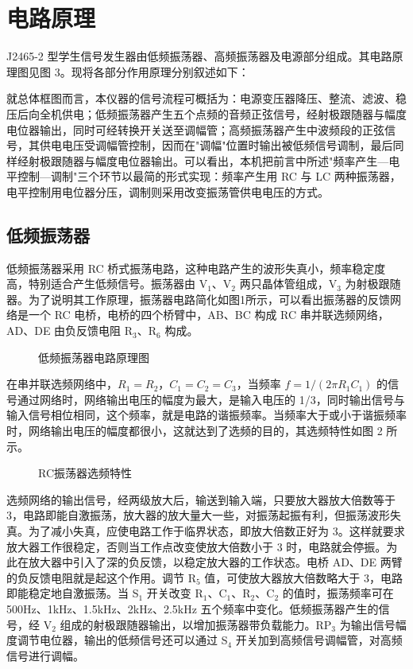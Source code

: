 \documentclass[12pt,UTF8]{ctexbook}
\begin{document}
\section{电路原理}

J2465-2 型学生信号发生器由低频振荡器、高频振荡器及电源部分组成。其电路原理图见图 3。现将各部分作用原理分别叙述如下：

就总体框图而言，本仪器的信号流程可概括为：电源变压器降压、整流、滤波、稳压后向全机供电；低频振荡器产生五个点频的音频正弦信号，经射极跟随器与幅度电位器输出，同时可经转换开关送至调幅管；高频振荡器产生中波频段的正弦信号，其供电电压受调幅管控制，因而在"调幅"位置时输出被低频信号调制，最后同样经射极跟随器与幅度电位器输出。可以看出，本机把前言中所述"频率产生—电平控制—调制"三个环节以最简的形式实现：频率产生用 RC 与 LC 两种振荡器，电平控制用电位器分压，调制则采用改变振荡管供电电压的方式。
	
\subsection{低频振荡器}

低频振荡器采用 RC 桥式振荡电路，这种电路产生的波形失真小，频率稳定度高，特别适合产生低频信号。振荡器由 V\(_1\)、V\(_2\) 两只晶体管组成，V\(_3\) 为射极跟随器。为了说明其工作原理，振荡器电路简化如图1所示，可以看出振荡器的反馈网络是一个 RC 电桥，电桥的四个桥臂中，AB、BC 构成 RC 串并联选频网络，AD、DE 由负反馈电阻 R\(_3\)、R\(_6\) 构成。
	
	\begin{figure}[H]
		\centering
		\caption{低频振荡器电路原理图}
		\label{fig:low_freq_osc}
	\end{figure}
	
	在串并联选频网络中，\(R_1=R_2\)，\(C_1=C_2=C_3\)，当频率 \(f=1/(2\pi R_1C_1)\) 的信号通过网络时，网络输出电压的幅度为最大，是输入电压的 1/3，同时输出信号与输入信号相位相同，这个频率，就是电路的谐振频率。当频率大于或小于谐振频率时，网络输出电压的幅度都很小，这就达到了选频的目的，其选频特性如图 2 所示。
	
	\begin{figure}[H]
		\centering
		\caption{RC振荡器选频特性}
		\label{fig:rc_response}
	\end{figure}
	
	选频网络的输出信号，经两级放大后，输送到输入端，只要放大器放大倍数等于 3，电路即能自激振荡，放大器的放大量大一些，对振荡起振有利，但振荡波形失真。为了减小失真，应使电路工作于临界状态，即放大倍数正好为 3。这样就要求放大器工作很稳定，否则当工作点改变使放大倍数小于 3 时，电路就会停振。为此在放大器中引入了深的负反馈，以稳定放大器的工作状态。电桥 AD、DE 两臂的负反馈电阻就是起这个作用。调节 R\(_5\) 值，可使放大器放大倍数略大于 3，电路即能稳定地自激振荡。当 S\(_1\) 开关改变 R\(_1\)、C\(_1\)、R\(_2\)、C\(_2\) 的值时，振荡频率可在 500Hz、1kHz、1.5kHz、2kHz、2.5kHz 五个频率中变化。低频振荡器产生的信号，经 V\(_2\) 组成的射极跟随器输出，以增加振荡器带负载能力。RP\(_3\) 为输出信号幅度调节电位器，输出的低频信号还可以通过 S\(_4\) 开关加到高频信号调幅管，对高频信号进行调幅。
	
\end{document}
